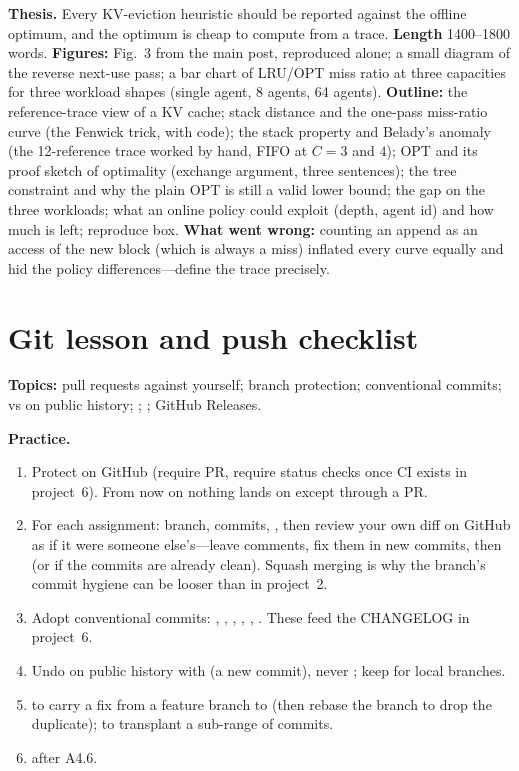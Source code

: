 \begin{blogbox}
\textbf{Thesis.} Every KV-eviction heuristic should be reported against the offline optimum, and the optimum is cheap to compute from a trace. \textbf{Length} 1400--1800 words. \textbf{Figures:} Fig.~3 from the main post, reproduced alone; a small diagram of the reverse next-use pass; a bar chart of LRU/OPT miss ratio at three capacities for three workload shapes (single agent, 8 agents, 64 agents). \textbf{Outline:} the reference-trace view of a KV cache; stack distance and the one-pass miss-ratio curve (the Fenwick trick, with code); the stack property and Belady's anomaly (the 12-reference trace worked by hand, FIFO at $C=3$ and $4$); OPT and its proof sketch of optimality (exchange argument, three sentences); the tree constraint and why the plain OPT is still a valid lower bound; the gap on the three workloads; what an online policy could exploit (depth, agent id) and how much is left; reproduce box. \textbf{What went wrong:} counting an append as an access of the new block (which is always a miss) inflated every curve equally and hid the policy differences---define the trace precisely.
\end{blogbox}

\section{Git lesson and push checklist}

\begin{gitbox}
\textbf{Topics:} pull requests against yourself; branch protection; conventional commits;  vs  on public history; ; ; GitHub Releases.

\textbf{Practice.}
\begin{enumerate}
  \item Protect  on GitHub (require PR, require status checks once CI exists in project~6). From now on nothing lands on  except through a PR.
  \item For each assignment: branch, commits, , then review your own diff on GitHub as if it were someone else's---leave comments, fix them in new commits, then  (or  if the commits are already clean). Squash merging is why the branch's commit hygiene can be looser than in project~2.
  \item Adopt conventional commits: , , , , , . These feed the CHANGELOG in project~6.
  \item Undo on public history with  (a new commit), never ; keep  for local branches.
  \item {} to carry a fix from a feature branch to  (then rebase the branch to drop the duplicate);  to transplant a sub-range of commits.
  \item {} after A4.6.
\end{enumerate}
\end{gitbox}
